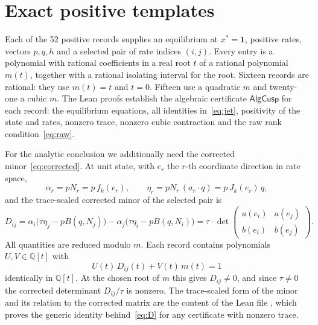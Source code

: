 \documentclass[11pt,a4paper]{article}
\theoremstyle{plain}
\theoremstyle{definition}
\theoremstyle{remark}
\numberwithin{equation}{section}
\newcommand{\Q}{\mathbb{Q}}
\newcommand{\one}{\mathbf{1}}
\newcommand{\AlgCusp}{\mathsf{AlgCusp}}
\begin{document}
\section{Exact positive templates}\label{sec:positive}

Each of the 52 positive records supplies an equilibrium at $x^*=\one$, positive rates, vectors $p,q,h$ and a selected pair of rate indices $(i,j)$. Every entry is a polynomial with rational coefficients in a real root $t$ of a rational polynomial $m(t)$, together with a rational isolating interval for the root. Sixteen records are rational: they use $m(t)=t$ and $t=0$. Fifteen use a quadratic $m$ and twenty-one a cubic $m$. The Lean proofs establish the algebraic certificate $\AlgCusp$ for each record: the equilibrium equations, all identities in~\eqref{eq:jet}, positivity of the state and rates, nonzero trace, nonzero cubic contraction and the raw rank condition~\eqref{eq:raw}.

For the analytic conclusion we additionally need the corrected minor~\eqref{eq:corrected}. At unit state, with $e_r$ the $r$-th coordinate direction in rate space,
\[
 \alpha_r=pN_r=p\,f_k(e_r),\qquad \eta_r=pN_r\,(a_r\!\cdot\!q)=p\,J_k(e_r)\,q,
\]
and the trace-scaled corrected minor of the selected pair is
\begin{equation}\label{eq:D}
 D_{ij}=\alpha_i\bigl(\tau\eta_j-pB(q,N_j)\bigr)-\alpha_j\bigl(\tau\eta_i-pB(q,N_i)\bigr)
 =\tau\cdot\det\begin{pmatrix}a(e_i)&a(e_j)\\ b(e_i)&b(e_j)\end{pmatrix}.
\end{equation}
All quantities are reduced modulo $m$. Each record contains polynomials $U,V\in\Q[t]$ with
\begin{equation}\label{eq:bezout}
 U(t)\,D_{ij}(t)+V(t)\,m(t)=1
\end{equation}
identically in $\Q[t]$. At the chosen root of $m$ this gives $D_{ij}\ne0$, and since $\tau\ne0$ the corrected determinant $D_{ij}/\tau$ is nonzero. The trace-scaled form of the minor and its relation to the corrected matrix are the content of the Lean file , which proves the generic identity behind~\eqref{eq:D} for any certificate with nonzero trace.
\end{document}
